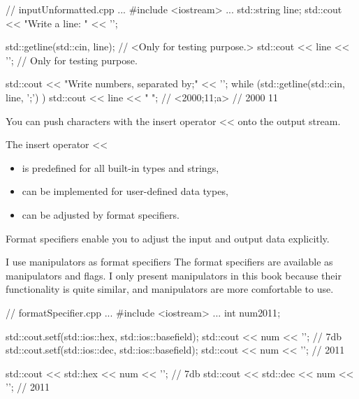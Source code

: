 \begin{cpp}
// inputUnformatted.cpp
...
#include <iostream>
...
std::string line;
std::cout << "Write a line: " << '\n';

std::getline(std::cin, line); // <Only for testing purpose.>
std::cout << line << '\n'; // Only for testing purpose.

std::cout << "Write numbers, separated by;" << '\n';
while (std::getline(std::cin, line, ';') ) {
	std::cout << line << " ";
} // <2000;11;a>
  // 2000 11
\end{cpp}



You can push characters with the insert operator <{}< onto the output stream.

The insert operator <{}<

\begin{itemize}
\item 
is predefined for all built-in types and strings,

\item 
can be implemented for user-defined data types,

\item 
can be adjusted by format specifiers.
\end{itemize}



Format specifiers enable you to adjust the input and output data explicitly.

\begin{myNotic}{I use manipulators as format specifiers}
The format specifiers are available as manipulators and flags. I only present manipulators in this book because their functionality is quite similar, and manipulators are more comfortable to use.


\begin{cpp}
// formatSpecifier.cpp
...
#include <iostream>
...
int num{2011};

std::cout.setf(std::ios::hex, std::ios::basefield);
std::cout << num << '\n'; // 7db
std::cout.setf(std::ios::dec, std::ios::basefield);
std::cout << num << '\n'; // 2011

std::cout << std::hex << num << '\n'; // 7db
std::cout << std::dec << num << '\n'; // 2011
\end{cpp}

\end{myNotic}

